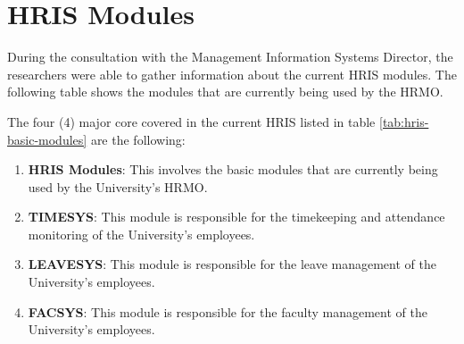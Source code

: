 \chapter{HRIS Modules}

\label{AppendixA}

During the consultation with the Management Information Systems Director, the researchers were able to gather information about the current HRIS modules. The following table shows the modules that are currently being used by the HRMO.

The four (4) major core covered in the current HRIS listed in table \ref{tab:hris-basic-modules} are the following:

\begin{enumerate}
    \item \textbf{HRIS Modules}: This involves the basic modules that are currently being used by the University's HRMO.
    \item \textbf{TIMESYS}: This module is responsible for the timekeeping and attendance monitoring of the University's employees.
    \item \textbf{LEAVESYS}: This module is responsible for the leave management of the University's employees.
    \item \textbf{FACSYS}: This module is responsible for the faculty management of the University's employees.
\end{enumerate}

